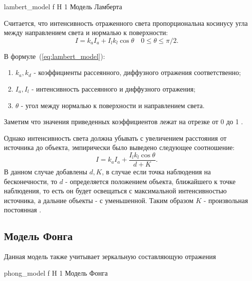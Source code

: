 {lambert_model} %
{f} %
{H} %
{1\textwidth} %
{Модель Ламберта} %



Считается, что интенсивность отраженного света
пропорциональна косинусу угла между направлением света и нормалью к поверхности:
\begin{equation} 
	I = k_aI_a + I_lk_l\cos\theta \quad 0 \leq \theta \leq \pi/2.
	\label{eq:lambert_model}
\end{equation}

В  формуле~(\ref{eq:lambert_model}):
\begin{enumerate}
	\item $k_a,k_d$ - коэффициенты рассеянного, диффузного отражения соответственно;
	\item $I_a,I_l$ - интенсивность рассеянного и диффузного отражения;
	\item $\theta$ - угол между нормалью к поверхности и направлением света.
\end{enumerate}
Заметим что значения приведенных коэффициентов лежат на отрезке от 0 до 1 \cite{Rodgers}.

Однако интенсивность света должна убывать с увеличением расстояния от источника до объекта, эмпирически было выведено следующее соотношение:
\begin{equation} 
	I = k_aI_a + \frac{I_lk_l\cos\theta}{d + K}.
	\label{eq:lambert_model_space}
\end{equation}
В данном случае добавлены $d,K$, в случае если точка наблюдения на бесконечности, то $d$ - определяется положением объекта,
ближайшего к точке наблюдения, то есть он будет освещаться с максимальной интенсивностью источника, а дальние объекты - с уменьшенной.
Таким образом $K$ - произвольная постоянная \cite{Rodgers}.


\subsection{Модель Фонга}
Данная модель также учитывает зеркальную составляющую отражения


{phong_model} %
{f} %
{H} %
{1\textwidth} %
{Модель Фонга} %



